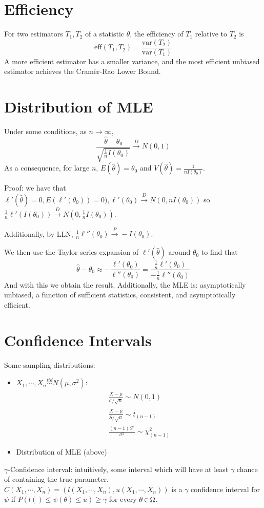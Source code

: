 \documentclass[letterpaper, 8pt]{extarticle}
\begin{document}
\begin{multicols*}{3}
    \section{Efficiency}
    For two estimators $T_1,T_2$ of a statistic $\theta$, the efficiency of $T_1$ relative to $T_2$ is
    \[\text{eff}(T_1,T_2)=\frac{\text{var}(T_2)}{\text{var}(T_1)}\]
    A more efficient estimator has a smaller variance, and the most efficient unbiased estimator achieves the Cram\`er-Rao Lower Bound.

    \section{Distribution of MLE}
    Under some conditions, as $n\to\infty$, 
    \[\frac{\hat\theta-\theta_0}{\sqrt{\frac{1}{n}I(\theta_0)}}\overset{D}{\to}N(0,1)\]
    As a consequence, for large $n$, $E(\hat\theta)=\theta_0$ and $V(\hat\theta)=\frac{1}{nI(\theta_0)}$.

    Proof: we have that $\ell'(\hat\theta)=0, E(\ell'(\theta_0))=0), \ell'(\theta_0)\overset{D}{\to}N(0,nI(\theta_0))$ so $\frac{1}{n}\ell'(I(\theta_0))\overset{D}{\to}N(0,\frac{1}{n}I(\theta_0))$. 
    
    Additionally, by LLN, $\frac{1}{n}\ell''(\theta_0)\overset{P}{\to}-I(\theta_0)$. 

    We then use the Taylor series expansion of $\ell'(\hat\theta)$ around $\theta_0$ to find that
    \[\hat\theta-\theta_0\approx-\frac{\ell'(\theta_0)}{\ell''(\theta_0)}=\frac{\frac{1}{n}\ell'(\theta_0)}{-\frac{1}{n}\ell''(\theta_0)}\]
    And with this we obtain the result. Additionally, the MLE is: asymptotically unbiased, a function of sufficient statistics, consistent, and asymptotically efficient.

    \section{Confidence Intervals}
    Some sampling distributions:
    \begin{itemize}
        \item $X_1,\cdots,X_n\overset{iid}{\sim}N(\mu,\sigma^2)$:
        \begin{gather*}
            \frac{\bar X-\mu}{\sigma/\sqrt n}\sim N(0,1) \\
            \frac{\bar X-\mu}{S/\sqrt n}\sim t_{(n-1)} \\
            \frac{(n-1)S^2}{\sigma^2}\sim\chi^2_{(n-1)}
        \end{gather*}
        \item Distribution of MLE (above)
    \end{itemize}
    $\gamma$-Confidence interval: intuitively, some interval which will have at least $\gamma$ chance of containing the true parameter. $C(X_1,\cdots,X_n)=(l(X_1,\cdots,X_n),u(X_1,\cdots,X_n))$ is a $\gamma$ confidence interval for $\psi$ if $P(l()\leq\psi(\theta)\leq u)\geq\gamma$ for every $\theta\,{\in}\,\Omega$.


\end{multicols*}
\end{document}

